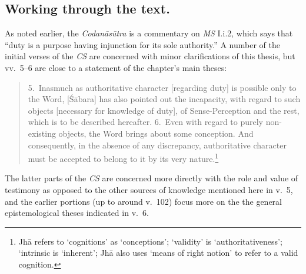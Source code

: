 ﻿\documentclass[11pt]{amsart}
\begin{document}






\subsection{Working through the text.} \label{textualinterpretation}

As noted earlier, the \emph{Codan\=as\=utra} is a commentary on \emph{MS} I.i.2, which says that ``duty is a purpose having injunction for its sole authority.'' A number of the initial verses of the \emph{CS} are concerned with minor clarifications of this thesis, but vv.~5--6 are close to a statement of the chapter's main theses:\small\begin{quote}5.~Inasmuch as authoritative character [regarding duty] is possible only to the Word, [\footnotesize\'S\small \=abara] has also pointed out the incapacity, with regard to such objects [necessary for knowledge of duty], of Sense-Perception and the rest, which is to be described hereafter. 6.~Even with regard to purely non-existing objects, the Word brings about some conception. And consequently, in the absence of any discrepancy, authoritative character must be accepted to belong to it by its very nature.\footnote{Jh\=a refers to `cognitions' as `conceptions'; `validity' is `authoritativeness'; `intrinsic is `inherent'; Jh\=a also uses `means of right notion' to refer to a valid cognition.}\end{quote}\normalsize The latter parts of the \emph{CS} are concerned more directly with the role and value of testimony as opposed to the other sources of knowledge mentioned here in v.~5, and the earlier portions (up to around v.~102) focus more on the the general epistemological theses indicated in v.~6.
\end{document}

